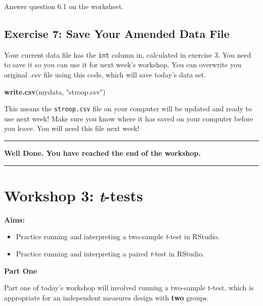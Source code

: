 \documentclass[
]{book}
\newenvironment{Shaded}{\begin{snugshade}}{\end{snugshade}}
\newcommand{\FunctionTok}[1]{\textcolor[rgb]{0.13,0.29,0.53}{\textbf{#1}}}
\newcommand{\NormalTok}[1]{#1}
\newcommand{\StringTok}[1]{\textcolor[rgb]{0.31,0.60,0.02}{#1}}
\let\oldsection\section
\renewcommand{\section}{\needspace{5\baselineskip}\oldsection}
\begin{document}
Answer question 6.1 on the worksheet.

\section{Exercise 7: Save Your Amended Data File}\label{exercise-7-save-your-amended-data-file}

Your current data file has the \texttt{int} column in, calculated in exercise 3. You need to save it so you can use it for next week's workshop. You can overwrite you original .csv file using this code, which will save today's data set.

\begin{Shaded}
\begin{Highlighting}[]
\FunctionTok{write.csv}\NormalTok{(mydata, }\StringTok{"stroop.csv"}\NormalTok{)}
\end{Highlighting}
\end{Shaded}

This means the \texttt{stroop.csv} file on your computer will be updated and ready to use next week! Make sure you know where it has saved on your computer before you leave. You will need this file next week!

\begin{center}\rule{0.5\linewidth}{0.5pt}\end{center}

\textbf{Well Done. You have reached the end of the workshop.}

\begin{center}\rule{0.5\linewidth}{0.5pt}\end{center}

\chapter{\texorpdfstring{Workshop 3: \emph{t}-tests}{Workshop 3: t-tests}}\label{workshop-3-t-tests}

\textbf{Aims:}

\begin{itemize}
\item
  Practice running and interpreting a two-sample \emph{t}-test in RStudio.
\item
  Practice running and interpreting a paired \emph{t}-test in RStudio.
\end{itemize}

\textbf{Part One}

Part one of today's workshop will involved running a two-sample t-test, which is appropriate for an independent measures design with \textbf{two} groups.
\end{document}

